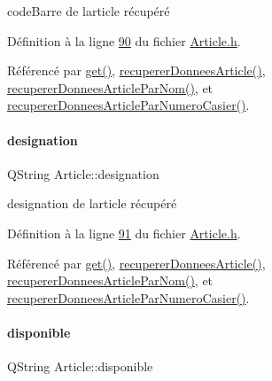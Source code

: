 code\+Barre de l\textquotesingle{}article récupéré 



Définition à la ligne \hyperlink{_article_8h_source_l00090}{90} du fichier \hyperlink{_article_8h_source}{Article.\+h}.



Référencé par \hyperlink{_article_8cpp_source_l00266}{get()}, \hyperlink{_article_8cpp_source_l00050}{recuperer\+Donnees\+Article()}, \hyperlink{_article_8cpp_source_l00103}{recuperer\+Donnees\+Article\+Par\+Nom()}, et \hyperlink{_article_8cpp_source_l00156}{recuperer\+Donnees\+Article\+Par\+Numero\+Casier()}.

\mbox{\label{class_article_a46a953cc2b35c8d868b27e8fa21c7a3a}} 
\paragraph{\texorpdfstring{designation}{designation}}
{\footnotesize\ttfamily Q\+String Article\+::designation\hspace{0.3cm}{\ttfamily [private]}}



designation de l\textquotesingle{}article récupéré 



Définition à la ligne \hyperlink{_article_8h_source_l00091}{91} du fichier \hyperlink{_article_8h_source}{Article.\+h}.



Référencé par \hyperlink{_article_8cpp_source_l00266}{get()}, \hyperlink{_article_8cpp_source_l00050}{recuperer\+Donnees\+Article()}, \hyperlink{_article_8cpp_source_l00103}{recuperer\+Donnees\+Article\+Par\+Nom()}, et \hyperlink{_article_8cpp_source_l00156}{recuperer\+Donnees\+Article\+Par\+Numero\+Casier()}.

\mbox{\label{class_article_ac361aa1f57e32243854735e84c6891e2}} 
\paragraph{\texorpdfstring{disponible}{disponible}}
{\footnotesize\ttfamily Q\+String Article\+::disponible\hspace{0.3cm}{\ttfamily [private]}}



